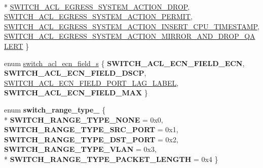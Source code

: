 \begin{DoxyCompactItemize}
\\*
\hyperlink{group__ACL_gga3f3d6a633ebb6283aad6b971ec96333dadb33ecdf9e19fb95dcc98ed3ab10d36b}{S\+W\+I\+T\+C\+H\+\_\+\+A\+C\+L\+\_\+\+E\+G\+R\+E\+S\+S\+\_\+\+S\+Y\+S\+T\+E\+M\+\_\+\+A\+C\+T\+I\+O\+N\+\_\+\+D\+R\+O\+P}, 
\hyperlink{group__ACL_gga3f3d6a633ebb6283aad6b971ec96333da00d37828ee95809948df5c4324fc6523}{S\+W\+I\+T\+C\+H\+\_\+\+A\+C\+L\+\_\+\+E\+G\+R\+E\+S\+S\+\_\+\+S\+Y\+S\+T\+E\+M\+\_\+\+A\+C\+T\+I\+O\+N\+\_\+\+P\+E\+R\+M\+I\+T}, 
\hyperlink{group__ACL_gga3f3d6a633ebb6283aad6b971ec96333da2a6673d5f9a3aaa2dd0f970afe6f55aa}{S\+W\+I\+T\+C\+H\+\_\+\+A\+C\+L\+\_\+\+E\+G\+R\+E\+S\+S\+\_\+\+S\+Y\+S\+T\+E\+M\+\_\+\+A\+C\+T\+I\+O\+N\+\_\+\+I\+N\+S\+E\+R\+T\+\_\+\+C\+P\+U\+\_\+\+T\+I\+M\+E\+S\+T\+A\+M\+P}, 
\hyperlink{group__ACL_gga3f3d6a633ebb6283aad6b971ec96333da2a35c469d76206eb39f9a9541af917dc}{S\+W\+I\+T\+C\+H\+\_\+\+A\+C\+L\+\_\+\+E\+G\+R\+E\+S\+S\+\_\+\+S\+Y\+S\+T\+E\+M\+\_\+\+A\+C\+T\+I\+O\+N\+\_\+\+M\+I\+R\+R\+O\+R\+\_\+\+A\+N\+D\+\_\+\+D\+R\+O\+P\+\_\+\+Q\+A\+L\+E\+R\+T}
 \}
\item 
enum \hyperlink{group__ACL_ga4e63c132b7660557ab1b847aac2b711b}{switch\+\_\+acl\+\_\+ecn\+\_\+field\+\_\+s} \{ {\bfseries S\+W\+I\+T\+C\+H\+\_\+\+A\+C\+L\+\_\+\+E\+C\+N\+\_\+\+F\+I\+E\+L\+D\+\_\+\+E\+C\+N}, 
{\bfseries S\+W\+I\+T\+C\+H\+\_\+\+A\+C\+L\+\_\+\+E\+C\+N\+\_\+\+F\+I\+E\+L\+D\+\_\+\+D\+S\+C\+P}, 
\hyperlink{group__ACL_gga4e63c132b7660557ab1b847aac2b711ba75c990c1e43f6ef3c2f7d8d250664fc3}{S\+W\+I\+T\+C\+H\+\_\+\+A\+C\+L\+\_\+\+E\+C\+N\+\_\+\+F\+I\+E\+L\+D\+\_\+\+P\+O\+R\+T\+\_\+\+L\+A\+G\+\_\+\+L\+A\+B\+E\+L}, 
{\bfseries S\+W\+I\+T\+C\+H\+\_\+\+A\+C\+L\+\_\+\+E\+C\+N\+\_\+\+F\+I\+E\+L\+D\+\_\+\+M\+A\+X}
 \}
\item 
\hypertarget{group__ACL_ga825e792c4f9c87a8fae57819aaa0e60d}{enum {\bfseries switch\+\_\+range\+\_\+type\+\_\+} \{ \\*
{\bfseries S\+W\+I\+T\+C\+H\+\_\+\+R\+A\+N\+G\+E\+\_\+\+T\+Y\+P\+E\+\_\+\+N\+O\+N\+E} = 0x0, 
{\bfseries S\+W\+I\+T\+C\+H\+\_\+\+R\+A\+N\+G\+E\+\_\+\+T\+Y\+P\+E\+\_\+\+S\+R\+C\+\_\+\+P\+O\+R\+T} = 0x1, 
{\bfseries S\+W\+I\+T\+C\+H\+\_\+\+R\+A\+N\+G\+E\+\_\+\+T\+Y\+P\+E\+\_\+\+D\+S\+T\+\_\+\+P\+O\+R\+T} = 0x2, 
{\bfseries S\+W\+I\+T\+C\+H\+\_\+\+R\+A\+N\+G\+E\+\_\+\+T\+Y\+P\+E\+\_\+\+V\+L\+A\+N} = 0x3, 
\\*
{\bfseries S\+W\+I\+T\+C\+H\+\_\+\+R\+A\+N\+G\+E\+\_\+\+T\+Y\+P\+E\+\_\+\+P\+A\+C\+K\+E\+T\+\_\+\+L\+E\+N\+G\+T\+H} = 0x4
 \}}\label{group__ACL_ga825e792c4f9c87a8fae57819aaa0e60d}

\end{DoxyCompactItemize}
